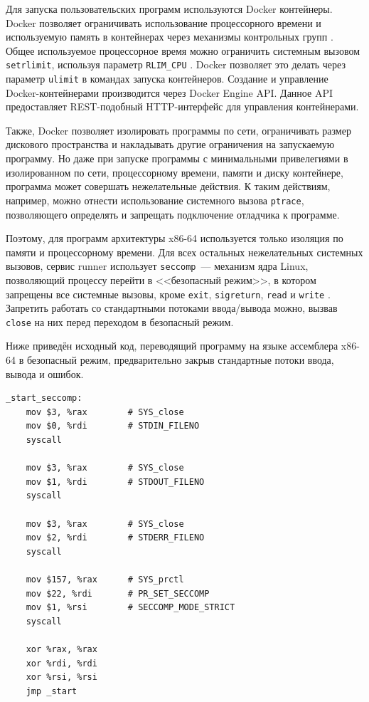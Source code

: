 \documentclass[a4paper,article,14pt]{extarticle}
\begin{document}
Для запуска пользовательских программ используются Docker контейнеры. Docker позволяет ограничивать использование процессорного времени и используемую память в контейнерах через механизмы контрольных групп \cite{dockerlimits}. Общее используемое процессорное время можно ограничить системным вызовом \texttt{setrlimit}, используя параметр \texttt{RLIM\_CPU} \cite{setrlimit}. Docker позволяет это делать через параметр \texttt{ulimit} в командах запуска контейнеров. Создание и управление Docker-контейнерами производится через Docker Engine API. Данное API предоставляет REST-подобный HTTP-интерфейс для управления контейнерами.

Также, Docker позволяет изолировать программы по сети, ограничивать размер дискового пространства и накладывать другие ограничения на запускаемую программу. Но даже при запуске программы с минимальными привелегиями в изолированном по сети, процессорному времени, памяти и диску контейнере, программа может совершать нежелательные действия. К таким действиям, например, можно отнести использование системного вызова \texttt{ptrace}, позволяющего определять и запрещать подключение отладчика к программе.

Поэтому, для программ архитектуры x86-64 используется только изоляция по памяти и процессорному времени. Для всех остальных нежелательных системных вызовов, сервис runner использует \texttt{seccomp}~--- механизм ядра Linux, позволяющий процессу перейти в <<безопасный режим>>, в котором запрещены все системные вызовы, кроме \texttt{exit}, \texttt{sigreturn}, \texttt{read} и \texttt{write} \cite{seccomp}. Запретить работать со стандартными потоками ввода/вывода можно, вызвав \texttt{close} на них перед переходом в безопасный режим.

Ниже приведён исходный код, переводящий программу на языке ассемблера x86-64 в безопасный режим, предварительно закрыв стандартные потоки ввода, вывода и ошибок.

\begin{verbatim}
_start_seccomp:
    mov $3, %rax        # SYS_close
    mov $0, %rdi        # STDIN_FILENO
    syscall

    mov $3, %rax        # SYS_close
    mov $1, %rdi        # STDOUT_FILENO
    syscall

    mov $3, %rax        # SYS_close
    mov $2, %rdi        # STDERR_FILENO
    syscall

    mov $157, %rax      # SYS_prctl
    mov $22, %rdi       # PR_SET_SECCOMP
    mov $1, %rsi        # SECCOMP_MODE_STRICT
    syscall

    xor %rax, %rax
    xor %rdi, %rdi
    xor %rsi, %rsi
    jmp _start
\end{verbatim}
\end{document}
